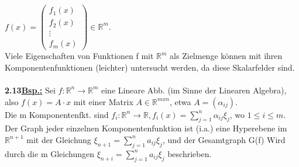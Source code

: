 \documentclass[]{scrartcl}
\begin{document}
$f(x)=\begin{pmatrix}
	f_1(x)\\f_2(x)\\\vdots\\f_m(x)
\end{pmatrix}
\in \mathbb{R}^m$.\\
Viele Eigenschaften von Funktionen f mit $\mathbb{R}^m$ als Zielmenge können 
mit ihren Komponentenfunktionen (leichter) untersucht werden, da diese 
Skalarfelder sind.\\
\\
\textbf{2.13\underline{Bsp.:}} Sei $f:\mathbb{R}^n\rightarrow\mathbb{R}^m$ eine 
Lineare Abb. (im Sinne der Linearen Algebra),\\
also $f(x)= A\cdot x$ mit einer Matrix $A\in \mathbb{R}^{mxn}$, etwa 
$A=(\alpha_{ij})$.\\
Die m Komponentenfkt. sind $f_i:\mathbb{R}^n\rightarrow\mathbb{R}, 
f_i(x)=\sum_{j=1}^{n}\alpha_{ij}\xi_j$, wo $1\leq i\leq m$.\\
Der Graph jeder einzelnen Komponentenfunktion ist (i.a.) eine Hyperebene im 
$\mathbb{R}^{n+1}$ mit der Gleichung $\xi_{n+1}=\sum_{j=1}^{n}a_{ij}\xi_j$, und 
der Gesamtgraph G(f) Wird durch die m Gleichungen 
$\xi_{n+i}=\sum_{j=1}^{n}a_{ij}\xi_j$ beschrieben.
\end{document}
